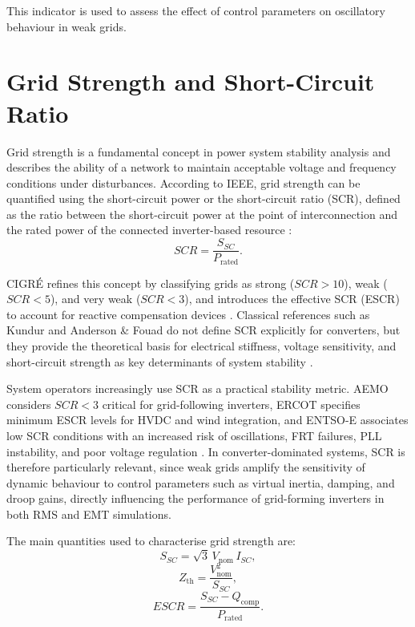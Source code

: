 This indicator is used to assess the effect of control parameters on oscillatory behaviour in weak grids. \cite{Akram2020HESS}



\section{Grid Strength and Short-Circuit Ratio}


Grid strength is a fundamental concept in power system stability analysis and describes the ability of a network to maintain acceptable voltage and frequency conditions under disturbances. According to IEEE, grid strength can be quantified using the short-circuit power or the short-circuit ratio (SCR), defined as the ratio between the short-circuit power at the point of interconnection and the rated power of the connected inverter-based resource \cite{ieee2800,ieee1547}:
\begin{equation}
    SCR = \frac{S_{SC}}{P_{\mathrm{rated}}}.
\end{equation}

CIGRÉ refines this concept by classifying grids as strong ($SCR > 10$), weak ($SCR < 5$), and very weak ($SCR < 3$), and introduces the effective SCR (ESCR) to account for reactive compensation devices \cite{cigreTB871}. Classical references such as Kundur and Anderson \& Fouad do not define SCR explicitly for converters, but they provide the theoretical basis for electrical stiffness, voltage sensitivity, and short-circuit strength as key determinants of system stability \cite{kundur1994,anderson2003}.

System operators increasingly use SCR as a practical stability metric. AEMO considers $SCR < 3$ critical for grid-following inverters, ERCOT specifies minimum ESCR levels for HVDC and wind integration, and ENTSO-E associates low SCR conditions with an increased risk of oscillations, FRT failures, PLL instability, and poor voltage regulation \cite{aemo2018,ercotHVDC,entsoe2016,EirGrid2025_GridCode}. In converter-dominated systems, SCR is therefore particularly relevant, since weak grids amplify the sensitivity of dynamic behaviour to control parameters such as virtual inertia, damping, and droop gains, directly influencing the performance of grid-forming inverters in both RMS and EMT simulations. \cite{VDEFNN2019_TechnicalConnection,AEMO2020_FOS,NERC2019_PRCPF}

The main quantities used to characterise grid strength are:
\begin{equation}
S_{SC} = \sqrt{3} \, V_{\mathrm{nom}} \, I_{SC},
\end{equation}
\begin{equation}
Z_{\mathrm{th}} = \frac{V_{\mathrm{nom}}^{2}}{S_{SC}},
\end{equation}
\begin{equation}
ESCR = \frac{S_{SC} - Q_{\mathrm{comp}}}{P_{\mathrm{rated}}}.
\end{equation}

